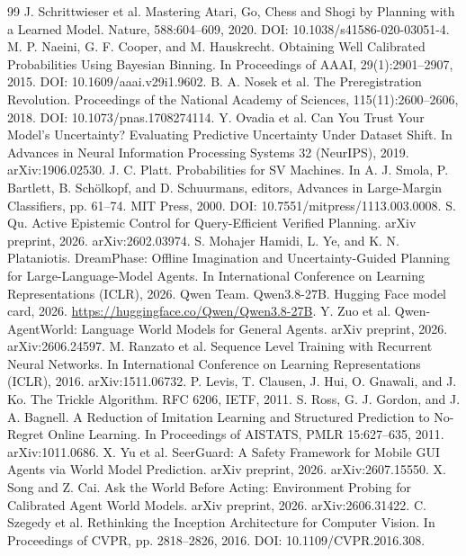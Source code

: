\documentclass[11pt]{article}
\begin{document}
\begin{thebibliography}{99}
 J. Schrittwieser et al. Mastering Atari, Go, Chess and Shogi by Planning with a Learned Model. Nature, 588:604--609, 2020. DOI: 10.1038/s41586-020-03051-4.
 M. P. Naeini, G. F. Cooper, and M. Hauskrecht. Obtaining Well Calibrated Probabilities Using Bayesian Binning. In Proceedings of AAAI, 29(1):2901--2907, 2015. DOI: 10.1609/aaai.v29i1.9602.
 B. A. Nosek et al. The Preregistration Revolution. Proceedings of the National Academy of Sciences, 115(11):2600--2606, 2018. DOI: 10.1073/pnas.1708274114.
 Y. Ovadia et al. Can You Trust Your Model's Uncertainty? Evaluating Predictive Uncertainty Under Dataset Shift. In Advances in Neural Information Processing Systems 32 (NeurIPS), 2019. arXiv:1906.02530.
 J. C. Platt. Probabilities for SV Machines. In A. J. Smola, P. Bartlett, B. Sch\"{o}lkopf, and D. Schuurmans, editors, Advances in Large-Margin Classifiers, pp. 61--74. MIT Press, 2000. DOI: 10.7551/mitpress/1113.003.0008.
 S. Qu. Active Epistemic Control for Query-Efficient Verified Planning. arXiv preprint, 2026. arXiv:2602.03974.
 S. Mohajer Hamidi, L. Ye, and K. N. Plataniotis. DreamPhase: Offline Imagination and Uncertainty-Guided Planning for Large-Language-Model Agents. In International Conference on Learning Representations (ICLR), 2026.
 Qwen Team. Qwen3.8-27B. Hugging Face model card, 2026. \url{https://huggingface.co/Qwen/Qwen3.8-27B}.
 Y. Zuo et al. Qwen-AgentWorld: Language World Models for General Agents. arXiv preprint, 2026. arXiv:2606.24597.
 M. Ranzato et al. Sequence Level Training with Recurrent Neural Networks. In International Conference on Learning Representations (ICLR), 2016. arXiv:1511.06732.
 P. Levis, T. Clausen, J. Hui, O. Gnawali, and J. Ko. The Trickle Algorithm. RFC 6206, IETF, 2011.
 S. Ross, G. J. Gordon, and J. A. Bagnell. A Reduction of Imitation Learning and Structured Prediction to No-Regret Online Learning. In Proceedings of AISTATS, PMLR 15:627--635, 2011. arXiv:1011.0686.
 X. Yu et al. SeerGuard: A Safety Framework for Mobile GUI Agents via World Model Prediction. arXiv preprint, 2026. arXiv:2607.15550.
 X. Song and Z. Cai. Ask the World Before Acting: Environment Probing for Calibrated Agent World Models. arXiv preprint, 2026. arXiv:2606.31422.
 C. Szegedy et al. Rethinking the Inception Architecture for Computer Vision. In Proceedings of CVPR, pp. 2818--2826, 2016. DOI: 10.1109/CVPR.2016.308.

\end{thebibliography}
\end{document}

